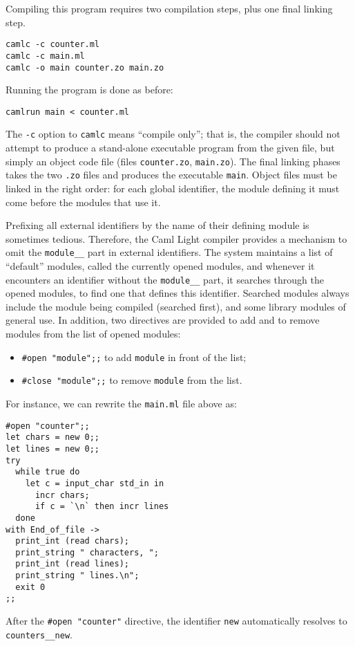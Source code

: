 Compiling this program requires two compilation steps, plus one final
linking step.
\begin{verbatim}
camlc -c counter.ml
camlc -c main.ml
camlc -o main counter.zo main.zo
\end{verbatim}
Running the program is done as before:
\begin{verbatim}
camlrun main < counter.ml
\end{verbatim}
The \verb"-c" option to \verb"camlc" means ``compile only''; that is,
the compiler should not attempt to produce a stand-alone executable
program from the given file, but simply an object code file (files
\verb"counter.zo", \verb"main.zo"). The final linking phases takes the
two \verb".zo" files and produces the executable \verb"main". Object
files must be linked in the right order: for each global identifier,
the module defining it must come before the modules that use it.

\medskip

Prefixing all external identifiers by the name of their defining
module is sometimes tedious. Therefore, the Caml Light compiler
provides a mechanism to omit the \verb"module__" part in external
identifiers. The system maintains a list of ``default'' modules, called
the currently opened modules, and whenever it encounters an identifier
without the \verb"module__" part, it searches through the opened modules,
to find one that defines this identifier. Searched modules always
include the module being compiled (searched first), and some library
modules of general use. In addition, two directives are provided to add
and to remove modules from the list of opened modules:
\begin{itemize}
\item \verb|#open "module";;| to add \verb"module" in front of the list;
\item \verb|#close "module";;| to remove \verb"module" from the list.
\end{itemize}
For instance, we can rewrite the \verb"main.ml" file above as:
\begin{verbatim}
#open "counter";;
let chars = new 0;;
let lines = new 0;;
try
  while true do
    let c = input_char std_in in
      incr chars;
      if c = `\n` then incr lines
  done
with End_of_file ->
  print_int (read chars);
  print_string " characters, ";
  print_int (read lines);
  print_string " lines.\n";
  exit 0
;;
\end{verbatim}
After the \verb|#open "counter"| directive, the identifier \verb"new"
automatically resolves to \verb"counters__new".

